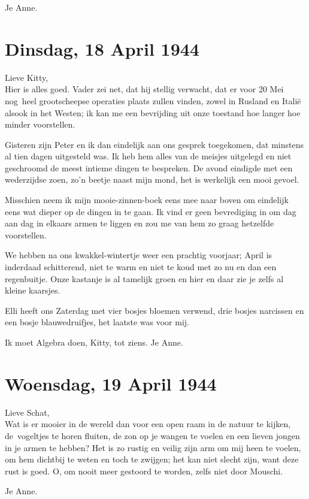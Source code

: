 \documentclass{book}
\begin{document}
Je Anne.

\section*{Dinsdag, 18 April 1944}

Lieve Kitty,\\
Hier is alles goed. Vader zei net, dat hij stellig verwacht, dat
er voor 20 Mei nog~heel grootscheepse operaties plaats zullen vinden, zowel in
Rusland en Italië alsook in het Westen; ik kan me een bevrijding uit onze
toestand hoe langer hoe minder voorstellen.

Gisteren zijn Peter en ik dan eindelijk aan ons gesprek toegekomen, dat minstens
al tien dagen uitgesteld was. Ik heb hem alles van de meisjes uitgelegd en niet
geschroomd de meest intieme dingen te bespreken. De avond eindigde met een
wederzijdse zoen, zo'n beetje naast mijn mond, het is werkelijk een mooi gevoel.

Misschien neem ik mijn mooie-zinnen-boek eens mee naar boven om eindelijk eens
wat dieper op de dingen in te gaan. Ik vind er geen bevrediging in om dag aan
dag in elkaars armen te liggen en zou me van hem zo graag hetzelfde voorstellen.

We hebben na ons kwakkel-wintertje weer een prachtig voorjaar; April is
inderdaad schitterend, niet te warm en niet te koud met zo nu en dan een
regenbuitje. Onze kastanje is al tamelijk groen en hier en daar zie je zelfs al
kleine kaarsjes.

Elli heeft ons Zaterdag met vier bosjes bloemen verwend, drie bosjes narcissen
en een bosje blauwedruifjes, het laatste was voor mij.

Ik moet Algebra doen, Kitty, tot ziens. Je Anne.

\section*{Woensdag, 19 April 1944}

Lieve Schat,\\
Wat is er mooier in de wereld dan voor een open raam in de natuur
te kijken, de~vogeltjes te horen fluiten, de zon op je wangen te voelen en een
lieven jongen in je armen te hebben? Het is zo rustig en veilig zijn arm om mij
heen te voelen, om hem dichtbij te weten en toch te zwijgen; het kan niet slecht
zijn, want deze rust is goed. O, om nooit meer gestoord te worden, zelfs niet
door Mouschi.

Je Anne.
\end{document}
